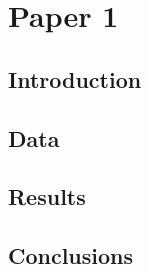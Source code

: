 
\chapter[Paper 1]{Paper 1}
\label{ch2}

\graphicspath{{./../gfx/Paper1/}}


\begin{abstract}
    \lipsum[1]
\end{abstract}

\section{Introduction}
    \lipsum

\section{Data}
\label{ch:p1:data}
    \lipsum

\section{Results}
    \lipsum

\section{Conclusions} 
    \lipsum
	

